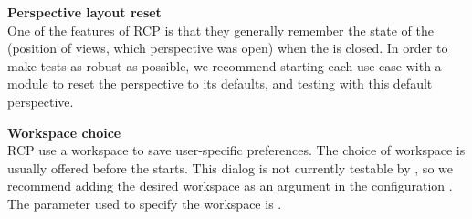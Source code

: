 
\textbf{Perspective layout reset}\\
One of the features of RCP \gdauts{} is that they generally remember the state of the \gdaut{} (position of views, which perspective was open) when the \gdaut{} is closed. In order to make tests as robust as possible, we recommend starting each use case with a module to reset the perspective to its defaults, and testing with this default perspective. 

\textbf{Workspace choice}\\
RCP \gdauts{} use a workspace to save user-specific preferences. The choice of workspace is usually offered before the \gdaut{} starts. This dialog is not currently testable by \app{}, so we recommend adding the desired workspace as an \gdaut{} argument in the \gdaut{} configuration . The parameter used to specify the workspace is .
